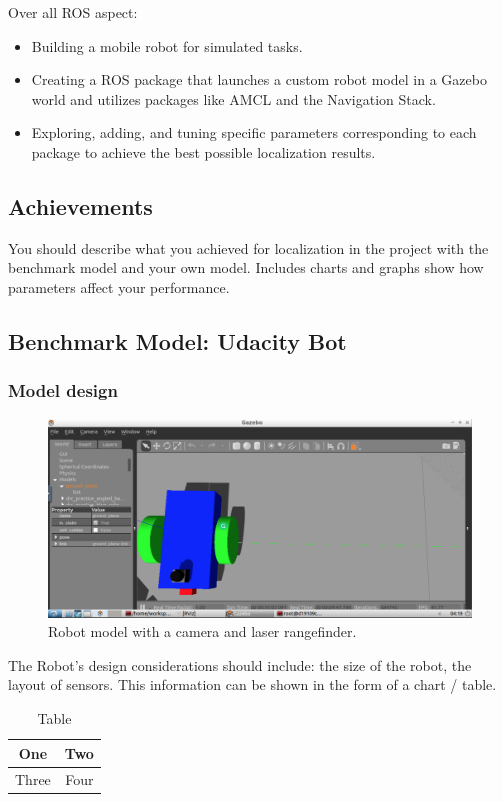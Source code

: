 \documentclass[10pt,journal,compsoc]{IEEEtran}
\begin{document}
 Over all ROS aspect:
\begin{itemize}
\item Building a mobile robot for simulated tasks.
\item Creating a ROS package that launches a custom robot model in a Gazebo world and utilizes packages like AMCL and the Navigation Stack.
\item Exploring, adding, and tuning specific parameters corresponding to each package to achieve the best possible localization results.
\end {itemize}

\subsection{Achievements}
You should describe what you achieved for localization in the project with the benchmark model and your own model. Includes charts and graphs show how parameters affect your performance. 

\subsection{Benchmark Model: Udacity Bot}
\subsubsection{Model design}

\begin{figure}[thpb]
      \centering
      \includegraphics[width=\linewidth]{laserrangefinder.png}
      \caption{Robot model with a camera and laser rangefinder.}
      \label{fig:robot1}
\end{figure}
The Robot's design considerations should include: the size of the robot, the layout of sensors. This information can be shown in the form of a chart / table.
\begin{table}[h]
\caption{Table}
\label{table_example}
\begin{center}
\begin{tabular}{|c||c|}
\hline
One & Two\\
\hline
Three & Four\\
\hline
\end{tabular}
\end{center}
\end{table}
\end{document}
